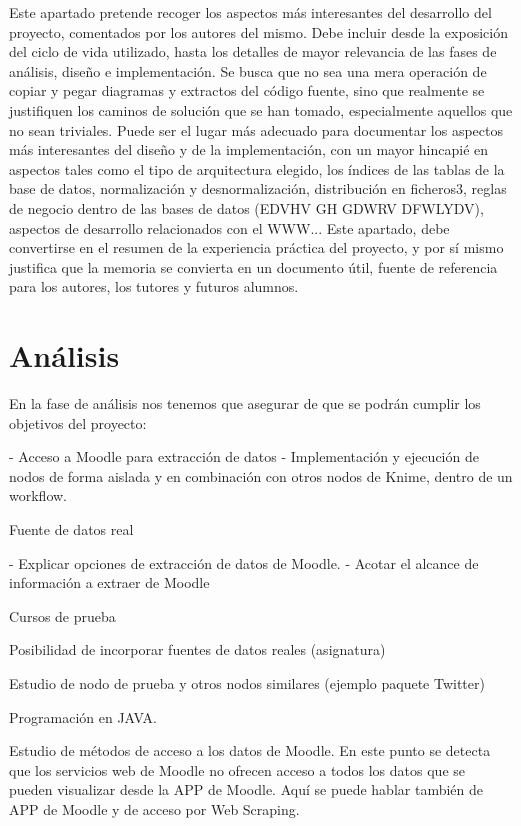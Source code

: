 
Este apartado pretende recoger los aspectos más interesantes del desarrollo del proyecto, comentados por los autores del mismo.
Debe incluir desde la exposición del ciclo de vida utilizado, hasta los detalles de mayor relevancia de las fases de análisis, diseño e implementación.
Se busca que no sea una mera operación de copiar y pegar diagramas y extractos del código fuente, sino que realmente se justifiquen los caminos de solución que se han tomado, especialmente aquellos que no sean triviales.
Puede ser el lugar más adecuado para documentar los aspectos más interesantes del diseño y de la implementación, con un mayor hincapié en aspectos tales como el tipo de arquitectura elegido, los índices de las tablas de la base de datos, normalización y desnormalización, distribución en ficheros3, reglas de negocio dentro de las bases de datos (EDVHV GH GDWRV DFWLYDV), aspectos de desarrollo relacionados con el WWW...
Este apartado, debe convertirse en el resumen de la experiencia práctica del proyecto, y por sí mismo justifica que la memoria se convierta en un documento útil, fuente de referencia para los autores, los tutores y futuros alumnos.



\section{Análisis}


En la fase de análisis nos tenemos que asegurar de que se podrán cumplir los objetivos del proyecto: 

- Acceso a Moodle para extracción de datos
- Implementación y ejecución de nodos de forma aislada y en combinación con otros nodos de Knime, dentro de un workflow.




Fuente de datos real

- Explicar opciones de extracción de datos de Moodle. 
- Acotar el alcance de información a extraer de Moodle



Cursos de prueba

Posibilidad de incorporar fuentes de datos reales (asignatura)

Estudio de nodo de prueba y otros nodos similares (ejemplo paquete Twitter)

Programación en JAVA. 


Estudio de métodos de acceso a los datos de Moodle. En este punto se detecta que los servicios web de Moodle no ofrecen acceso a todos los
datos que se pueden visualizar desde la APP de Moodle. Aquí se puede hablar también de APP de Moodle y de acceso por Web Scraping. 





